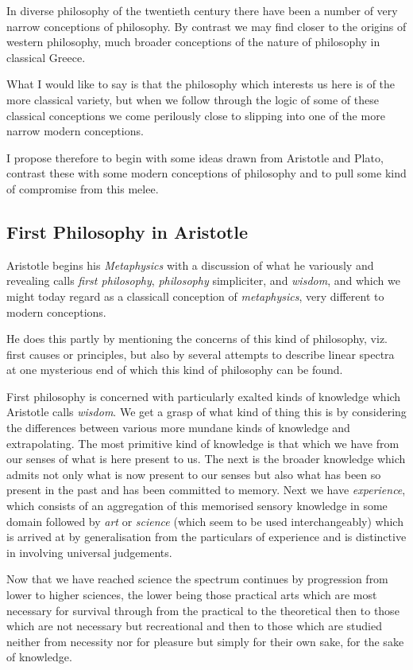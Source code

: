 \documentclass{rbjk}
\begin{document}
\begin{article}
In diverse philosophy of the twentieth century there have been a number of very narrow conceptions of philosophy.
By contrast we may find closer to the origins of western philosophy, much broader conceptions of the nature of philosophy in classical Greece.

What I would like to say is that the philosophy which interests us here is of the more classical variety, but when we follow through the logic of some of these classical conceptions we come perilously close to slipping into one of the more narrow modern conceptions.

I propose therefore to begin with some ideas drawn from Aristotle and Plato, contrast these with some modern conceptions of philosophy and to pull some kind of compromise from this melee.
 
\subsection{First Philosophy in Aristotle}

Aristotle begins his {\it Metaphysics} with a discussion of what he variously and revealing calls {\it first philosophy}, {\it philosophy} simpliciter, and {\it wisdom}, and which we might today regard as a classicall conception of {\it metaphysics}, very different to modern conceptions.

He does this partly by mentioning the concerns of this kind of philosophy, viz. first causes or principles, but also by several attempts to describe linear spectra at one mysterious end of which this kind of philosophy can be found.

First philosophy is concerned with particularly exalted kinds of knowledge which Aristotle calls {\it wisdom}.
We get a grasp of what kind of thing this is by considering the differences between various more mundane kinds of knowledge and extrapolating.
The most primitive kind of knowledge is that which we have from our senses of what is here present to us.
The next is the broader knowledge which admits not only what is now present to our senses but also what has been so present in the past and has been committed to memory.
Next we have {\it experience}, which consists of an aggregation of this memorised sensory knowledge in some domain followed by {\it art} or {\it science} (which seem to be used interchangeably) which is arrived at by generalisation from the particulars of experience and is distinctive in involving universal judgements.

Now that we have reached science the spectrum continues by progression from lower to higher sciences, the lower being those practical arts which are most necessary for survival through from the practical to the theoretical then to those which are not necessary but recreational and then to those which are studied neither from necessity nor for pleasure but simply for their own sake, for the sake of knowledge.



\end{article}
\end{document}
